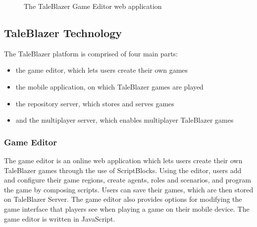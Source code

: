 \medskip
\begin{figure}[hbt]
	\caption[TaleBlazer Game Editor]{\label{fig:game_editor} The TaleBlazer Game Editor web application}
\end{figure}
\pagebreak

\subsection{TaleBlazer Technology}

The TaleBlazer platform is comprised of four main parts:
	\begin{itemize}
 		\item the game editor, which lets users create their own games
 		\item the mobile application, on which TaleBlazer games are played
 		\item the repository server, which stores and serves games
 		\item and the multiplayer server, which enables multiplayer TaleBlazer games
 	\end{itemize}

\subsubsection{Game Editor}
The game editor is an online web application which lets users create their own TaleBlazer games through the use of ScriptBlocks. Using the editor, users add and configure their game regions, create agents, roles and scenarios, and program the game by composing scripts. Users can save their games, which are then stored on TaleBlazer Server. The game editor also provides options for modifying the game interface that players see when playing a game on their mobile device. The game editor is written in JavaScript. 

